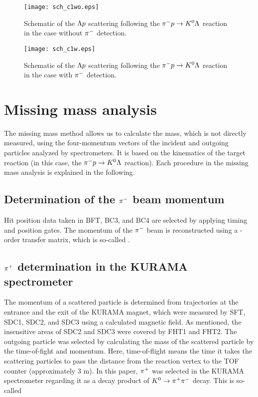 \begin{figure}[!h]
  \begin{center}
    \texttt{[image: sch\_c1wo.eps]}
    \caption{Schematic of the $\Lambda p$ scattering following the $\pi^- p \to K^0 \Lambda$ reaction in the case  without $\pi^{-}$ detection.}
    \label{fig-sch_c2wo}
  \end{center}
\end{figure}

\begin{figure}[!h]
  \begin{center}
    \texttt{[image: sch\_c1w.eps]}
    \caption{Schematic of the $\Lambda p$ scattering following the $\pi^- p \to K^0 \Lambda$ reaction in the case  with $\pi^{-}$ detection.}
    \label{fig-sch_c2w}
  \end{center}
\end{figure}


\clearpage
\section{Missing mass analysis}
The missing mass method allows us to calculate the mass, which is not directly measured, using the four-momentum vectors of the incident and outgoing particles analyzed by spectrometers. It is based on the kinematics of the target reaction (in this case, the $\pi^- p \to K^0 \Lambda$ reaction). Each procedure in the missing mass analysis is explained in the following.

\subsection{Determination of the $\pi^{-}$ beam momentum}
Hit position data taken in BFT, BC3, and BC4 are selected by applying timing and position gates. The momentum of the $\pi^{-}$ beam is reconstructed using a -order transfer matrix, which is so-called .
  
\subsection{$\pi^{+}$ determination in the KURAMA spectrometer}
The momentum of a scattered particle is determined from trajectories at the entrance and the exit of the KURAMA magnet, which were measured by SFT, SDC1, SDC2, and SDC3 using a calculated magnetic field. As mentioned, the insensitive areas of SDC2 and SDC3 were covered by FHT1 and FHT2. The outgoing particle was selected by calculating the mass of the scattered particle by the time-of-fight and momentum. Here, time-of-flight means the time it takes the scattering particles to pass the distance from the reaction vertex to the TOF counter (approximately 3 m). In this paper, $\pi^{+}$ was selected in the KURAMA spectrometer regarding it as a decay product of $K^0 \to \pi^+ \pi^-$ decay. This is so-called 
  

